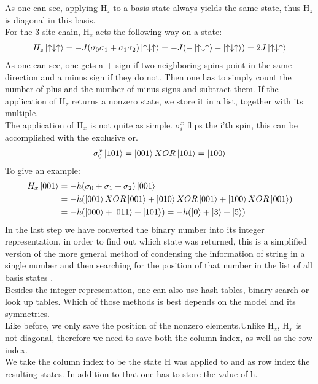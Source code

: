 \documentclass{article}
\begin{document}
As one can see, applying H$_z$ to a basis state always yields the same state, thus H$_z$ is diagonal in this basis.\\
For the 3 site chain, H$_z$ acts the following way on a state:
\begin{align*}
H_z \ket{\uparrow \downarrow \uparrow} = -J(\sigma_0\sigma_1 + \sigma_1\sigma_2) \ket{\uparrow \downarrow \uparrow} = -J(-\ket{\uparrow \downarrow \uparrow} - \ket{\uparrow \downarrow \uparrow}) = 2J \ket{\uparrow \downarrow \uparrow}
\end{align*}
As one can see, one gets a + sign if two neighboring spins point in the same direction and a minus sign if they do not. Then one has to simply count the number of plus and the number of minus signs and subtract them.
If the application of H$_z$ returns a nonzero state, we store it in a list, together with its multiple.\\
The application of H$_x$ is not quite as simple. $\sigma_i^x$ flips the i'th spin, this can be accomplished with the exclusive or.
\begin{align*}
\sigma_0^x \ket{101} = \ket{001} XOR \ket{101} = \ket{100}
\end{align*}
To give an example:
\begin{align*}
H_x \ket{001} &= -h(\sigma_0 + \sigma_1 + \sigma_2)\ket{001} \\
&= -h(\ket{001}XOR \ket{001} + \ket{010}XOR \ket{001} + \ket{100}XOR \ket{001})\\
&= -h(\ket{000} +\ket{011} +\ket{101}) = -h(\ket{0} + \ket{3} +\ket{5})
\end{align*}
In the last step we have converted the binary number into its integer
representation, in order to find out which state was returned, this is
a simplified version of the more general method of condensing the
information of  string in a single number and then searching for the
position of that number in the list of all basis states \cite{Zhang}.\\
Besides the integer representation, one can also use hash tables, binary search or look up tables. Which of those methods is best depends on the model and its symmetries.\\
Like before, we only save the position of the nonzero elements.Unlike H$_z$, H$_{x}$ is not diagonal, therefore we need to save both the column index, as well as the row index.\\
We take the column index to be the state H was applied to and as row
index the resulting states. In addition to that one has to store the value of h.\\
\end{document}
